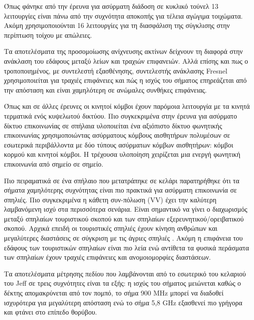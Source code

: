\documentclass[12pt]{article}
\begin{document}
\begin{multicols*}{2}
        Όπως φάνηκε από την έρευνα για ασύρματη διάδοση σε κυκλικό τούνελ \cite{dudley_wireless_2005}
        13 λειτουργίες είναι πάνω από την συχνότητα αποκοπής για τέλεια αγώγιμα τοιχώματα. Ακόμη
        χρησιμοποιούνται 16 λειτουργίες για τη διασφάλιση της σύγκλισης στην περίπτωση τοίχου 
        με απώλειες.

        Τα αποτελέσματα της προσομοίωσης ανίχνευσης ακτίνων \cite{soo_investigation_2018} δείχνουν
        τη διαφορά στην ανάκλαση του εδάφους μεταξύ λείων και τραχιών επιφανειών. Αλλά επίσης και
        πως ο τροποποιημένος, με συντελεστή εξασθένησης, συντελεστής ανάκλασης Fresnel χρησιμοποιείται
        για τραχιές επιφάνειες και πώς η ισχύς του σήματος επηρεάζεται από την απόσταση και είναι 
        χαμηλότερη σε ανώμαλες συνθήκες επιφάνειας.

        Όπως και σε άλλες έρευνες οι κινητοί κόμβοι έχουν παρόμοια λειτουργία με τα κινητά τερματικά
        ενός κυψελωτού δικτύου. Πιο συγκεκριμένα στην έρευνα για ασύρματο δίκτυο επικοινωνίας σε
        σπήλαια \cite{yavuz_-cave_2009} υλοποιείται ένα αξιόπιστο δίκτυο φωνητικής επικοινωνίας
        χρησιμοποιώντας ασύρματους κόμβους αισθητήρων πολυμέσων σε εσωτερικά περιβάλλοντα με δύο
        τύπους ασύρματων κόμβων αισθητήρων: κόμβοι κορμού και κινητοί κόμβοι. Η τρέχουσα υλοποίηση
        χειρίζεται μια ενεργή φωνητική επικοινωνία από σημείο σε σημείο.

        Πιο πειραματικά σε ένα σπήλαιο που μετατράπηκε σε κελάρι \cite{soo_propagation_2018}
        παρατηρήθηκε ότι τα σήματα χαμηλότερης συχνότητας είναι πιο πρακτικά για ασύρματη
        επικοινωνία σε σπηλιές. Πιο συγκεκριμένα η κάθετη συν-πόλωση (VV) έχει την καλύτερη
        λαμβανόμενη ισχύ στα περισσότερα σενάρια.
        Είναι σημαντικό να γίνει ο διαχωρισμός μεταξύ σπηλαίων τουριστικού σκοπού και των σπηλαίων
        εξερευνητικού/ορειβατικού σκοπού. Αρχικά επειδή οι τουριστικές σπηλιές έχουν κίνηση ανθρώπων
        και μεγαλύτερες διαστάσεις σε σύγκριση με τις άγριες σπηλιές \cite{soo_propagation_2018}.
        Ακόμη η επιφάνεια του εδάφους των τουριστικών σπηλαίων είναι πιο λεία ενώ αντίθετα τα φυσικά
        περάσματα των σπηλαίων έχουν τραχιές επιφάνειες και ανομοιομορφίες διαστάσεων.

        Τα αποτελέσματα μέτρησης πεδίου που λαμβάνονται από το εσωτερικό του κελαριού του
        Jeff \cite{soo_propagation_2018} σε τρεις συχνότητες είναι τα εξής: η ισχύς του σήματος
        μειώνεται καθώς ο δέκτης απομακρύνεται από τον πομπό, το σήμα 900 MHz μπορεί να διαδοθεί
        ισχυρότερα για μεγαλύτερη απόσταση ενώ το σήμα 5,8 GHz εξασθενεί πιο γρήγορα και φτάνει στο 
        επίπεδο θορύβου.


\end{multicols*}
\end{document}
